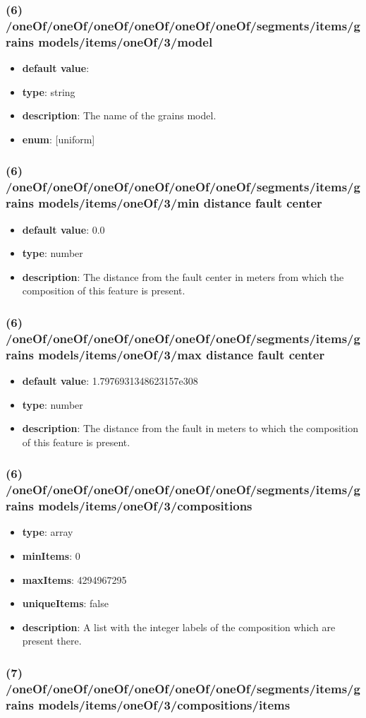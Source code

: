 \subsubsection{(6) /oneOf/oneOf/oneOf/oneOf/oneOf/oneOf/segments/items/grains models/items/oneOf/3/model}
\begin{itemize}[leftmargin=6em]\item {\bf default value}: 
\item {\bf type}: string
\item {\bf description}: The name of the grains model.
\item {\bf enum}: [uniform]\end{itemize}\subsubsection{(6) /oneOf/oneOf/oneOf/oneOf/oneOf/oneOf/segments/items/grains models/items/oneOf/3/min distance fault center}
\begin{itemize}[leftmargin=6em]\item {\bf default value}: 0.0
\item {\bf type}: number
\item {\bf description}: The distance from the fault center in meters from which the composition of this feature is present.
\end{itemize}\subsubsection{(6) /oneOf/oneOf/oneOf/oneOf/oneOf/oneOf/segments/items/grains models/items/oneOf/3/max distance fault center}
\begin{itemize}[leftmargin=6em]\item {\bf default value}: 1.7976931348623157e308
\item {\bf type}: number
\item {\bf description}: The distance from the fault in meters to which the composition of this feature is present.
\end{itemize}\subsubsection{(6) /oneOf/oneOf/oneOf/oneOf/oneOf/oneOf/segments/items/grains models/items/oneOf/3/compositions}
\begin{itemize}[leftmargin=6em]\item {\bf type}: array
\item {\bf minItems}: 0
\item {\bf maxItems}: 4294967295
\item {\bf uniqueItems}: false
\item {\bf description}: A list with the integer labels of the composition which are present there.
\end{itemize}\subsubsection{(7) /oneOf/oneOf/oneOf/oneOf/oneOf/oneOf/segments/items/grains models/items/oneOf/3/compositions/items}
